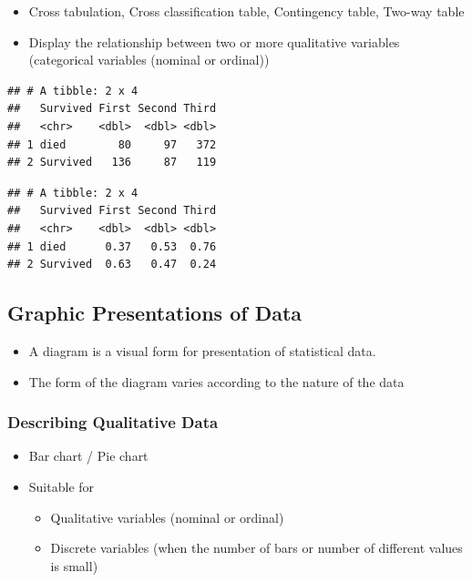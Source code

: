 \documentclass[]{book}
\providecommand{\tightlist}{%
  \setlength{\itemsep}{0pt}\setlength{\parskip}{0pt}}
\begin{document}
\begin{itemize}
\tightlist
\item
  Cross tabulation, Cross classification table, Contingency table, Two-way table
\item
  Display the relationship between two or more qualitative variables (categorical variables (nominal or ordinal))
\end{itemize}

\begin{verbatim}
## # A tibble: 2 x 4
##   Survived First Second Third
##   <chr>    <dbl>  <dbl> <dbl>
## 1 died        80     97   372
## 2 Survived   136     87   119
\end{verbatim}

\begin{verbatim}
## # A tibble: 2 x 4
##   Survived First Second Third
##   <chr>    <dbl>  <dbl> <dbl>
## 1 died      0.37   0.53  0.76
## 2 Survived  0.63   0.47  0.24
\end{verbatim}

\hypertarget{graphic-presentations-of-data}{%
\subsection{Graphic Presentations of Data}\label{graphic-presentations-of-data}}

\begin{itemize}
\tightlist
\item
  A diagram is a visual form for presentation of statistical data.
\item
  The form of the diagram varies according to the nature of the data
\end{itemize}

\hypertarget{describing-qualitative-data}{%
\subsubsection{Describing Qualitative Data}\label{describing-qualitative-data}}

\begin{itemize}
\tightlist
\item
  Bar chart / Pie chart
\item
  Suitable for

  \begin{itemize}
  \tightlist
  \item
    Qualitative variables (nominal or ordinal)
  \item
    Discrete variables (when the number of bars or number of different values is small)
  \end{itemize}
\end{itemize}
\end{document}
